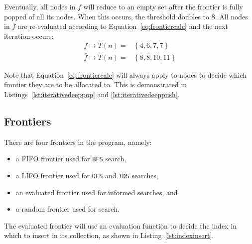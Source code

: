 Eventually, all nodes in $f$ will reduce to an empty set after the frontier is
fully popped of all its nodes. When this occurs, the threshold doubles to 8.
All nodes in $\bar{f}$ are re-evaluated according to Equation~\ref{eq:frontiercalc}
and the next iteration occurs:
\begin{align*}
       f  \mapsto T(n) =& \ \{ \ 4 , 6 , 7 , 7  \ \}\\
  \bar{f} \mapsto T(n) =& \ \{ \ 8 , 8 , 10, 11 \ \}
\end{align*}

Note that Equation~\ref{eq:frontiercalc} will always apply to nodes to decide
which frontier they are to be allocated to. This is demonstrated in
Listings~\ref{lst:iterativedeeppop} and \ref{lst:iterativedeeppush}.





\subsection{Frontiers}
\label{sub:Frontiers}

There are four frontiers in the program, namely:

\begin{itemize}
  \item a FIFO frontier used for \texttt{BFS} search,
  \item a LIFO frontier used for \texttt{DFS} and \texttt{IDS} searches,
  \item an evaluated frontier used for informed searches, and
  \item a random frontier used for  search.
\end{itemize}

The evaluated frontier will use an evaluation function to decide the index
in which to insert in its collection, as shown in Listing~\ref{lst:indexinsert}.

